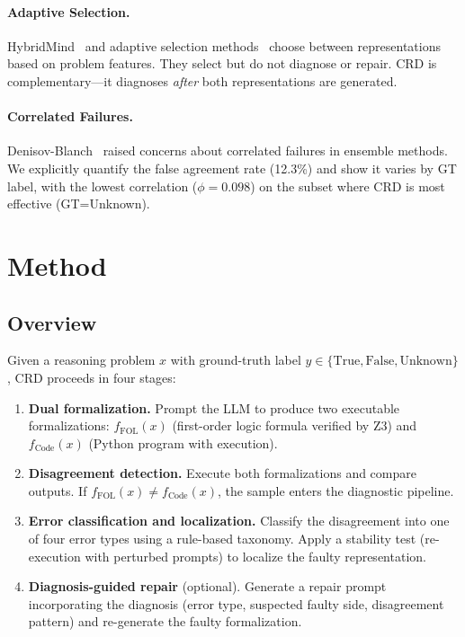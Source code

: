 \documentclass[11pt,a4paper]{article}
\newcommand{\method}{CRD}
\begin{document}
\paragraph{Adaptive Selection.}
HybridMind~\cite{li2024hybridmind} and adaptive selection methods~\cite{sun2024adaptive} choose between representations based on problem features. They select but do not diagnose or repair. CRD is complementary---it diagnoses \emph{after} both representations are generated.

\paragraph{Correlated Failures.}
Denisov-Blanch~\cite{denisovblanch2026} raised concerns about correlated failures in ensemble methods. We explicitly quantify the false agreement rate (12.3\%) and show it varies by GT label, with the lowest correlation ($\phi\!=\!0.098$) on the subset where CRD is most effective (GT=Unknown).

\section{Method}

\subsection{Overview}

Given a reasoning problem $x$ with ground-truth label $y \in \{\text{True}, \text{False}, \text{Unknown}\}$, \method{} proceeds in four stages:

\begin{enumerate}
\item \textbf{Dual formalization.} Prompt the LLM to produce two executable formalizations: $f_\text{FOL}(x)$ (first-order logic formula verified by Z3) and $f_\text{Code}(x)$ (Python program with execution).
\item \textbf{Disagreement detection.} Execute both formalizations and compare outputs. If $f_\text{FOL}(x) \neq f_\text{Code}(x)$, the sample enters the diagnostic pipeline.
\item \textbf{Error classification and localization.} Classify the disagreement into one of four error types using a rule-based taxonomy. Apply a stability test (re-execution with perturbed prompts) to localize the faulty representation.
\item \textbf{Diagnosis-guided repair} (optional). Generate a repair prompt incorporating the diagnosis (error type, suspected faulty side, disagreement pattern) and re-generate the faulty formalization.
\end{enumerate}
\end{document}
